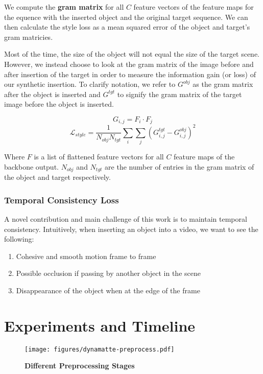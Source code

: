 \documentclass{article}
\begin{document}
We compute the \textbf{gram matrix} for all $C$ feature vectors of the feature maps for the equence with the inserted object and the original target sequence. We can then calculate the style loss as a mean squared error of the object and target's gram matricies.

Most of the time, the size of the object will not equal the size of the target scene. However, we instead choose to look at the gram matrix of the image before and after insertion of the target in order to measure the information gain (or loss) of our synthetic insertion. To clarify notation, we refer to $G^{obj}$ as the gram matrix after the object is inserted and $G^{tgt}$ to signify the gram matrix of the target image before the object is inserted.

$$G_{i, j} = F_i \cdot F_j$$
$$\mathcal{L}_{style} = \frac{1}{N_{obj} N_{tgt}} \sum_i \sum_j (G_{i, j}^{tgt} - G_{i, j}^{obj})^2$$

Where $F$ is a list of flattened feature vectors for all $C$ feature maps of the backbone output. $N_{obj}$ and $N_{tgt}$ are the number of entries in the gram matrix of the object and target respectively.

\subsubsection{Temporal Consistency Loss}
A novel contribution and main challenge of this work is to maintain temporal consistency. Intuitively, when inserting an object into a video, we want to see the following:

\begin{enumerate}
    \item Cohesive and smooth motion frame to frame
    \item Possible occlusion if passing by another object in the scene
    \item Disappearance of the object when at the edge of the frame
\end{enumerate}

\section{Experiments and Timeline}
\begin{figure}
    \centering
    \texttt{[image: figures/dynamatte-preprocess.pdf]}
    \caption{\textbf{Different Preprocessing Stages}}
    \label{fig:preprocess}
\end{figure}
\end{document}
